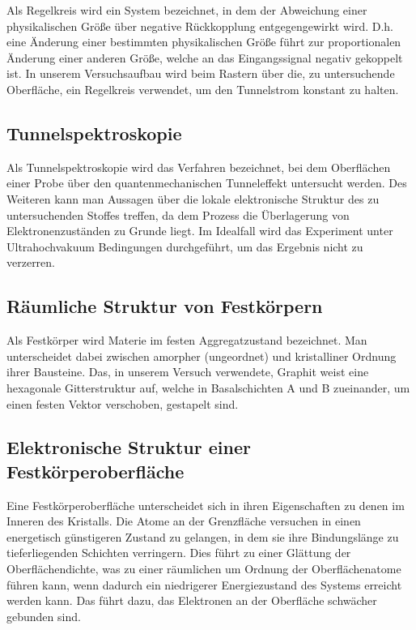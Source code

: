 \documentclass[10pt,a4paper]{article}
\begin{document}
Als Regelkreis wird ein System bezeichnet, in dem der Abweichung einer physikalischen Größe über negative Rückkopplung entgegengewirkt wird. D.h. eine Änderung einer bestimmten physikalischen Größe führt zur proportionalen Änderung einer anderen Größe, welche an das Eingangssignal negativ gekoppelt ist. In unserem Versuchsaufbau wird beim Rastern über die, zu untersuchende Oberfläche, ein Regelkreis verwendet, um den Tunnelstrom konstant zu halten.

\subsection{	Tunnelspektroskopie}

Als Tunnelspektroskopie wird das Verfahren bezeichnet, bei dem Oberflächen einer Probe über den quantenmechanischen Tunneleffekt untersucht werden. Des Weiteren kann man Aussagen über die lokale elektronische Struktur des zu untersuchenden Stoffes treffen, da dem Prozess die Überlagerung von Elektronenzuständen zu Grunde liegt. Im Idealfall wird das Experiment unter Ultrahochvakuum Bedingungen durchgeführt, um das Ergebnis nicht zu verzerren.

\subsection{	Räumliche Struktur von Festkörpern}

Als Festkörper wird Materie im festen Aggregatzustand bezeichnet. Man unterscheidet dabei zwischen amorpher (ungeordnet) und kristalliner Ordnung ihrer Bausteine. Das, in unserem Versuch verwendete, Graphit weist eine hexagonale Gitterstruktur auf, welche in Basalschichten A und B zueinander, um einen festen Vektor verschoben, gestapelt sind. 

\subsection{	Elektronische Struktur einer Festkörperoberfläche}

Eine Festkörperoberfläche unterscheidet sich in ihren Eigenschaften zu denen im Inneren des Kristalls. Die Atome an der Grenzfläche versuchen in einen energetisch günstigeren Zustand zu gelangen, in dem sie ihre Bindungslänge zu tieferliegenden Schichten verringern. Dies führt zu einer Glättung der Oberflächendichte, was zu einer räumlichen um Ordnung der Oberflächenatome führen kann, wenn dadurch ein niedrigerer Energiezustand des Systems erreicht werden kann. Das führt dazu, das Elektronen an der Oberfläche schwächer gebunden sind.
\end{document}
